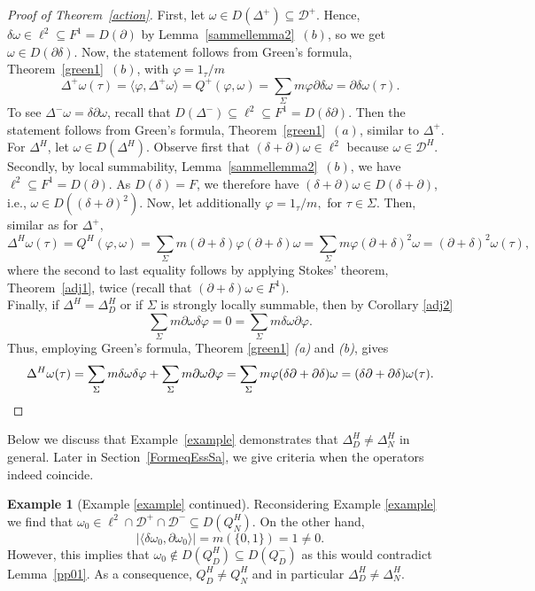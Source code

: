 \documentclass[10pt]{amsart}
\theoremstyle{definition}
\newtheorem{example}[theorem]{Example}
\newcommand{\F}{{F}}
\begin{document}
\begin{proof}[Proof of Theorem~\ref{action}]
First, let $\omega\in D(\Delta^+)\subseteq \mathcal{D}^{+}$. Hence, $\delta\omega\in \ell^{2}\subseteq F^{1}=D(\partial)$ by Lemma~\ref{sammellemma2}~$(b)$, so we get $\omega\in D(\partial\delta).$ Now, the statement follows from Green's formula, Theorem~\ref{green1}~$(b)$,  with $\varphi = 1_\tau/m$  
$$\Delta^+\omega(\tau) = \langle\varphi,\Delta^+\omega\rangle = Q^+(\varphi,\omega) = \sum_{\Sigma}m \varphi \partial\delta\omega  = \partial\delta\omega(\tau).$$
To see  $\Delta^-\omega= \delta\partial\omega$, recall that $D(\Delta^-)\subseteq\ell^2\subseteq \F^1=D(\delta\partial).$ Then the statement follows from Green's formula, Theorem~\ref{green1}~$(a)$,  similar to $\Delta^{+}$.\\
For $\Delta^H$, let $\omega\in D(\Delta^{H})$. Observe first that $(\delta+\partial)\omega\in\ell^2$ because $\omega\in\mathcal{D}^H.$  Secondly, by local summability, Lemma~\ref{sammellemma2}~$(b)$, we have $\ell^{2}\subseteq F^{1}=D(\partial)$. As $D(\delta)=F$, we therefore have $(\delta+\partial)\omega\in D(\delta+\partial)$, i.e., $\omega\in D((\delta+\partial)^{2})$. Now, let additionally $\varphi = 1_{\tau}/m,$ for $\tau\in \Sigma$. Then, similar as for $\Delta^+,$
$$\Delta^H\omega(\tau) = Q^H(\varphi,\omega) = \sum_\Sigma m(\partial+\delta)\varphi(\partial+\delta)\omega = \sum_\Sigma m\varphi(\partial+\delta)^2\omega = (\partial+\delta)^2\omega(\tau),$$
where the second to last equality follows by applying Stokes' theorem, Theorem~\ref{adj1}, twice (recall that $(\partial+\delta)\omega\in F^1).$\\
Finally, if $\Delta^H = \Delta^H_D$ or if $\Sigma$ is strongly locally summable, then by Corollary \ref{adj2}
$$\sum_\Sigma m\partial\omega\delta\varphi = 0 = \sum_\Sigma m\delta\omega\partial\varphi.$$
Thus, %
employing Green's formula, Theorem \ref{green1} \emph{(a)} and \emph{(b)}, gives
$$\Delta^H\omega(\tau) = \sum_\Sigma m\delta\omega\delta\varphi+\sum_\Sigma m\partial\omega\partial\varphi = \sum_\Sigma m\varphi(\delta\partial+\partial\delta)\omega = (\delta\partial+\partial\delta)\omega(\tau).\hfill \qedhere$$
\end{proof}

Below we discuss that Example~\ref{example} demonstrates that $\Delta^{H}_{D}\neq \Delta^{H}_{N}$ in general. Later in Section~\ref{FormeqEssSa}, we give criteria when the operators indeed coincide.

\begin{example}[Example \ref{example} continued]\label{example_cont}
	Reconsidering Example \ref{example} we find that $\omega_{0}\in\ell^2\cap\mathcal{D}^+\cap\mathcal{D}^-\subseteq D(Q^H_N).$ On the other hand, 
	$$\vert\langle\delta\omega_{0},\partial\omega_{0}\rangle\vert = m(\lbrace 0,1\rbrace) = 1\neq 0.$$ However, this implies that $\omega_{0}\not\in D(Q^H_{D})\subseteq D(Q^-_{D})$ as this would contradict Lemma~\ref{pp01}. As a consequence, $Q^H_{D}\neq Q^H_N$ and in particular $\Delta^H_D\neq\Delta^H_{N}.$
\end{example}
\end{document}
